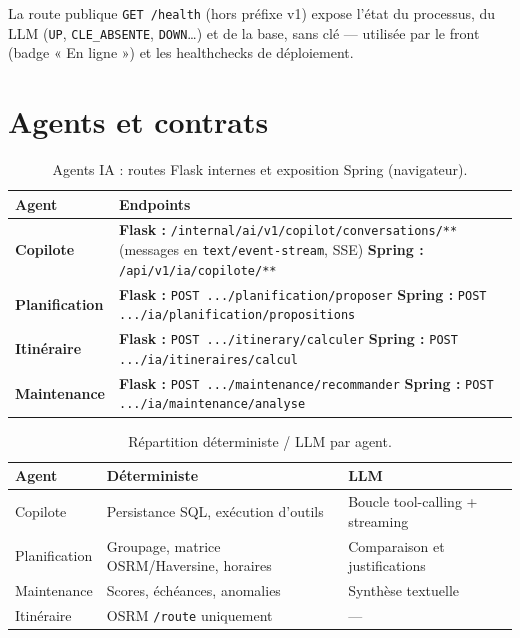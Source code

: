 La route publique \texttt{GET /health} (hors préfixe v1) expose l'état du processus, du LLM
(\texttt{UP}, \texttt{CLE\_ABSENTE}, \texttt{DOWN}\ldots) et de la base, sans clé --- utilisée par le
front (badge « En ligne ») et les healthchecks de déploiement.

\section{Agents et contrats}

\begin{table}[ht]
\centering
\caption{Agents IA : routes Flask internes et exposition Spring (navigateur).}
\label{tab:agents}
\renewcommand{\arraystretch}{1.35}
\begin{tabularx}{\linewidth}{@{}>{\bfseries}l X@{}}
\toprule
Agent & Endpoints \\
\midrule
Copilote &
  \textbf{Flask :} \texttt{/internal/ai/v1/copilot/conversations/**}\newline
  \quad (messages en \texttt{text/event-stream}, SSE)\newline
  \textbf{Spring :} \texttt{/api/v1/ia/copilote/**} \\
Planification &
  \textbf{Flask :} \texttt{POST .../planification/proposer}\newline
  \textbf{Spring :} \texttt{POST .../ia/planification/propositions} \\
Itinéraire &
  \textbf{Flask :} \texttt{POST .../itinerary/calculer}\newline
  \textbf{Spring :} \texttt{POST .../ia/itineraires/calcul} \\
Maintenance &
  \textbf{Flask :} \texttt{POST .../maintenance/recommander}\newline
  \textbf{Spring :} \texttt{POST .../ia/maintenance/analyse} \\
\bottomrule
\end{tabularx}
\end{table}

\begin{table}[ht]
\centering
\caption{Répartition déterministe / LLM par agent.}
\label{tab:ia-det-llm}
\small
\begin{tabular}{@{}lll@{}}
\toprule
Agent & Déterministe & LLM \\
\midrule
Copilote & Persistance SQL, exécution d'outils & Boucle tool-calling + streaming \\
Planification & Groupage, matrice OSRM/Haversine, horaires & Comparaison et justifications \\
Maintenance & Scores, échéances, anomalies & Synthèse textuelle \\
Itinéraire & OSRM \texttt{/route} uniquement & --- \\
\bottomrule
\end{tabular}
\end{table}

